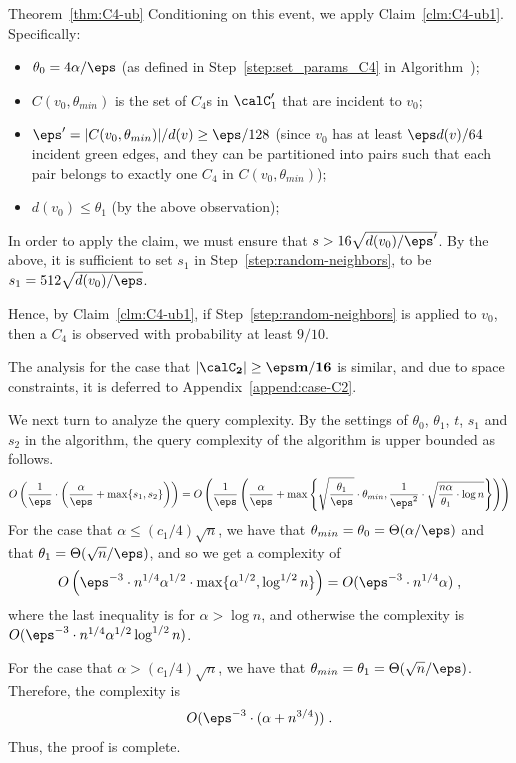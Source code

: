 \begin{proofof}{Theorem~\ref{thm:C4-ub}}
 Conditioning on this event, we apply Claim~\ref{clm:C4-ub1}. 
 Specifically:
 \begin{itemize}
     \item $\theta_0=4\alpha/\eps$ 
      (as defined in Step~\ref{step:set_params_C4} in Algorithm~\TestCfour); %
     \item $C(v_0,\theta_{min})$ is the set of $C_4$s in $\calC'_1$ that are incident to $v_0$;
     \item $\eps' = |C(v_0,\theta_{min})|/d(v) \geq \eps/128$ (since $v_0$ has at least $\eps d(v)/64$ incident green edges, and they can be partitioned into pairs such that each pair belongs to exactly one $C_4$ in $C(v_0,\theta_{min})$);
     \item $d(v_0) \leq \theta_1$ (by 
     the above observation);
 \end{itemize}
 In order to apply the claim, we must ensure that $s>16\sqrt{d(v_0)/\eps'}$. By the above, it is sufficient to set $s_1$ in Step~\ref{step:random-neighbors}, to be $s_1=512\sqrt{d(v_0)/\eps}$.
 
 Hence, by Claim~\ref{clm:C4-ub1}, if Step~\ref{step:random-neighbors} is applied to $v_0$, then a $C_4$ is observed with probability at least $9/10$.

The analysis for the case that $\mathbf{|\calC_2| \geq \eps m/16}$ is similar, and due to space constraints, it is deferred to Appendix~\ref{append:case-C2}. 

We next turn to analyze the query complexity. By the settings of $\theta_0$, $\theta_1$, $t$, $s_1$ and $s_2$ in the algorithm,
the query complexity of the algorithm is upper bounded as follows.
\begin{equation}
O\left(\frac{1}{\eps}\cdot \left(\frac{\alpha}{\eps}+\max\{s_1, s_2\}\right) \right) =
%
O\left(\frac{1}{\eps}\left( \frac{\alpha}{\eps}+\max\left\{\sqrt{\frac{\theta_1}{\eps}}\cdot \theta_{min}, \frac{1}{\eps^2}\cdot \sqrt{\frac{n\alpha}{\theta_1}\cdot\log n}\right\} \right) \right) 
\end{equation}
For the case that $\alpha\leq(c_1/4)\sqrt n$, we have that $\theta_{min}=\theta_0=\Theta(\alpha/\eps)$ and that $\theta_1=\Theta(\sqrt n/\eps)$, and so we get a complexity of
\begin{equation}
     O\left(
\eps^{-3} \cdot n^{1/4}\alpha^{1/2} \cdot \max\{\alpha^{1/2},\log^{1/2} n\}
 \right) = O(\eps^{-3}\cdot n^{1/4}\alpha)\;,
\end{equation}
where the last inequality is for $\alpha>\log n$, and otherwise the complexity is $O(\eps^{-3}\cdot n^{1/4}\alpha^{1/2}\log^{1/2} n)$. 

For the case that $\alpha>(c_1/4)\sqrt{n}$, we have that $\theta_{min}=\theta_1=\Theta(\sqrt n/\eps)$. Therefore, the complexity is
\begin{equation}
     O(\eps^{-3}\cdot (\alpha+n^{3/4}))\;.
\end{equation}
Thus, the proof is complete.
\end{proofof}
